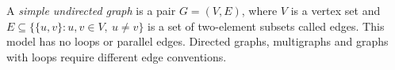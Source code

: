 
A \emph{simple undirected graph} is a pair $G=(V,E)$, where $V$ is a vertex set and $E\subseteq\{\{u,v\}:u,v\in V,\ u\ne v\}$ is a set of two-element subsets called edges. This model has no loops or parallel edges. Directed graphs, multigraphs and graphs with loops require different edge conventions.
